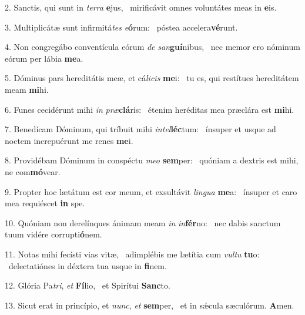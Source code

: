 2. Sanctis, qui sunt in \textit{ter}\textit{ra} \textbf{e}jus, \ast\  mirificávit omnes voluntátes meas in \textbf{e}is.\

3. Multiplicátæ sunt infirmitá\textit{tes} \textit{e}\textbf{ó}rum: \ast\  póstea accelera\textbf{vé}runt.\

4. Non congregábo conventícula eórum \textit{de} \textit{san}\textbf{guí}nibus, \ast\  nec memor ero nóminum eórum per lábia \textbf{me}a.\

5. Dóminus pars hereditátis meæ, et cá\textit{li}\textit{cis} \textbf{me}i: \ast\  tu es, qui restítues hereditátem meam \textbf{mi}hi.\

6. Funes cecidérunt mihi \textit{in} \textit{præ}\textbf{clá}ris: \ast\  étenim heréditas mea præclára est \textbf{mi}hi.\

7. Benedícam Dóminum, qui tríbuit mihi \textit{in}\textit{tel}\textbf{léc}tum: \ast\  ínsuper et usque ad noctem increpuérunt me renes \textbf{me}i.\

8. Providébam Dóminum in conspéctu \textit{me}\textit{o} \textbf{sem}per: \ast\  quóniam a dextris est mihi, ne com\textbf{mó}vear.\

9. Propter hoc lætátum est cor meum, et exsultávit \textit{lin}\textit{gua} \textbf{me}a: \ast\  ínsuper et caro mea requiéscet \textbf{in} spe.\

10. Quóniam non derelínques ánimam meam \textit{in} \textit{in}\textbf{fér}no: \ast\  nec dabis sanctum tuum vidére corrupti\textbf{ó}nem.\

11. Notas mihi fecísti vias vitæ, \dag\  adimplébis me lætítia cum \textit{vul}\textit{tu} \textbf{tu}o: \ast\  delectatiónes in déxtera tua usque in \textbf{fi}nem.\

12. Glória Pa\textit{tri}, \textit{et} \textbf{Fí}lio, \ast\  et Spirítui \textbf{Sanc}to.\

13. Sicut erat in princípio, et \textit{nunc}, \textit{et} \textbf{sem}per, \ast\  et in sǽcula sæculórum. \textbf{A}men.\

